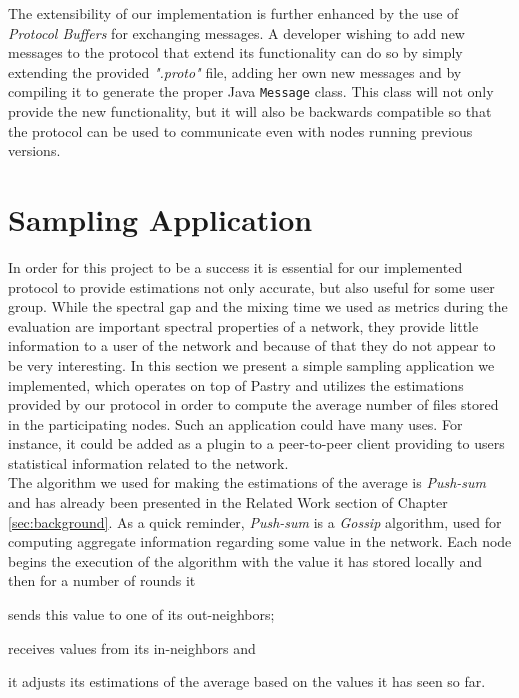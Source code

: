 \documentclass[a4paper,11pt,twoside]{report}
\newcommand{\classname}[1]{\texttt{#1}}
\begin{document}
The extensibility of our implementation is further enhanced by the use of \textit{Protocol Buffers} for exchanging messages. A developer wishing to add new messages to the protocol that extend its functionality can do so by simply extending the provided \textit{".proto"} file, adding her own new messages and by compiling it to generate the proper Java \classname{Message} class. This class will not only provide the new functionality, but it will also be backwards compatible so that the protocol can be used to communicate even with nodes running previous versions.\\






\section{Sampling Application}
\label{sec:sampling_app}

In order for this project to be a success it is essential for our implemented protocol to provide estimations not only accurate, but also useful for some user group. While the spectral gap and the mixing time we used as metrics during the evaluation are important spectral properties of a network, they provide little information to a user of the network and because of that they do not appear to be very interesting. In this section we present a simple sampling application we implemented, which operates on top of Pastry and utilizes the estimations provided by our protocol in order to compute the average number of files stored in the participating nodes. Such an application could have many uses. For instance, it could be added as a plugin to a peer-to-peer client providing to users statistical information related to the network.\\

The algorithm we used for making the estimations of the average is \textit{Push-sum} and has already been presented in the Related Work section of Chapter \ref{sec:background}. As a quick reminder, \textit{Push-sum} is a \textit{Gossip} algorithm, used for computing aggregate information regarding some value in the network. Each node begins the execution of the algorithm with the value it has stored locally and then for a number of rounds it \begin{inparaenum}
\item sends this value to one of its out-neighbors;
\item receives values from its in-neighbors and
\item it adjusts its estimations of the average based on the values it has seen so far.
\end{inparaenum} \\
\end{document}
